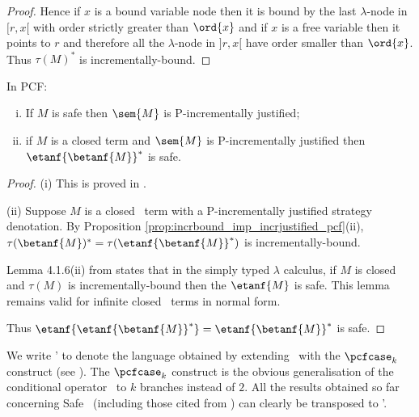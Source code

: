 \begin{proof}
Hence if $x$ is a bound variable node then it is bound by the
last $\lambda$-node in $[r,x[$ with order strictly greater than
$\ord{x}$ and if $x$ is a free variable then it points to $r$ and
therefore all the $\lambda$-node in $]r,x[$ have order smaller than
$\ord{x}$. Thus $\tau(M)^*$ is incrementally-bound.

\end{proof}

\begin{theorem}
\label{thm:safeincrejust_pcf} In PCF:
\begin{enumerate}[(i)]
\item If $M$ is safe then $\sem{M}$ is P-incrementally justified;
\item if $M$ is a closed term and $\sem{M}$ is
  P-incrementally justified then $\etanf{\betanf{M}}^*$ is safe.
\end{enumerate}
\end{theorem}
\begin{proof}
\noindent(i)
This is proved in  \cite[Theorem 4.2.10]{blumtransfer}.

\noindent(ii) Suppose $M$ is a closed \pcf\ term with a P-incrementally justified strategy denotation. By Proposition \ref{prop:incrbound_imp_incrjustified_pcf}(ii), $\tau(\betanf{M})^* = \tau(\etanf{\betanf{M}}^*)$ is incrementally-bound.

Lemma 4.1.6(ii) from \cite{blumtransfer} states that in the simply typed $\lambda$ calculus, if $M$ is closed and $\tau(M)$ is incrementally-bound then the $\etanf{M}$ is safe.
This lemma remains valid for infinite closed \pcf\ terms in normal form.

Thus $\etanf{\etanf{\betanf{M}}^*} = \etanf{\betanf{M}}^*$ is safe.
\end{proof}


We write \pcf' to denote the language obtained by extending \pcf\
with the $\pcfcase_k$ construct (see \cite{Abr02}).
The $\pcfcase_k$ construct is the obvious generalisation of the
conditional operator \pcfcond\ to $k$ branches instead of $2$. All the results obtained so far concerning Safe \pcf\ (including those
cited from \cite{blumtransfer}) can clearly be transposed to \pcf'.


